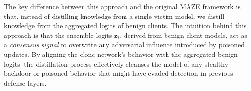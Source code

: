 The key difference between this approach and the original MAZE framework is that, instead of distilling knowledge from a single victim model, we distill knowledge from the aggregated logits of benign clients. The intuition behind this approach is that the ensemble logits \( \mathbf{\bar{z}}_t \), derived from benign client models, act as a \textit{consensus signal} to overwrite any adversarial influence introduced by poisoned updates. By aligning the clone network’s behavior with the aggregated benign logits, the distillation process effectively cleanses the model of any stealthy backdoor or poisoned behavior that might have evaded detection in previous defense layers. 
\label{goal3}




